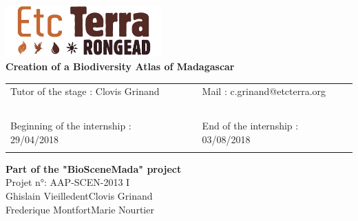 \renewcommand{\bibsection}{}
\begin{center}
\vspace{1.5cm}
\includegraphics[width=6cm]{figures/ETCTERRA.png}\\
\vspace{1.5cm}
{\Large \textbf{Creation of a Biodiversity Atlas of Madagascar}}\\
\vspace{1.5cm}
\begin{tabular}{lcl}
Tutor of the stage : Clovis Grinand & \hspace{1cm} & Mail : c.grinand@etcterra.org  \\ 
~ & ~ \\
Beginning of the internship : 29/04/2018 & \hspace{1cm} & End of the internship : 03/08/2018\\
\vspace{1.5cm}
\end{tabular}
{\large
  \textbf{
    Part of the "BioSceneMada" project\\
  }
}
\vspace{1cm}
Projet n°: AAP-SCEN-2013 I\\
\vspace{1cm}
{\large 
  Ghislain Vieilledent\hspace{1cm}Clovis Grinand\\
  \vspace{0.25cm}
  Frederique Montfort\hspace{1cm}Marie Nourtier\\
}
\end{center}
\newpage